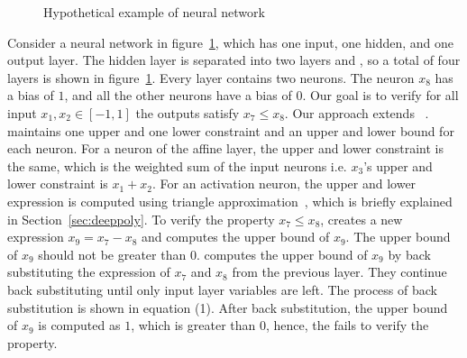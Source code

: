 \begin{figure}[t]
	\centering
	\scalebox{0.8}{}
	\caption{Hypothetical example of neural network}
	\label{fig:motivating}
\end{figure}
Consider a neural network in figure~\ref{fig:motivating},  which has one input, one hidden, and one output layer. The hidden layer is separated into two layers 
\affine{} and \relu{}, so a total of four layers is shown in figure~\ref{fig:motivating}. 
Every layer contains two neurons. The neuron $x_8$ has a bias of $1$, and all the other neurons have a bias of $0$. 
Our goal is to verify for all input $x_1,x_2 \in [-1,1]$ the outputs satisfy $x_7 \leq x_8$. 
Our approach extends \deeppoly{}~\cite{singh2019abstract}.
\deeppoly{} maintains one upper and
one lower constraint and an upper and lower bound for each neuron.
For a neuron of the affine layer, the upper and lower constraint is 
the same, which is the weighted sum of the input neurons i.e. $x_3$'s upper and lower constraint is $x_1+x_2$.
For an activation neuron, the upper and lower expression is computed using triangle approximation~\cite{singh2019abstract}, 
which is briefly explained in Section~\ref{sec:deeppoly}. To verify the property $x_7 \leq x_8$, \deeppoly{} creates a 
new expression $x_9 = x_7 - x_8$ and computes the upper bound of $x_9$. The upper bound of $x_9$ should not be greater
than $0$. \deeppoly{} computes the upper bound of $x_9$ by back substituting the expression of $x_7$ and $x_8$ 
from the previous layer.
They continue back substituting until only input layer variables are left.
The process of back substitution is shown in equation (1). %
After back substitution, the upper bound of $x_9$ is
computed as $1$, which is greater than $0$, 
hence, the \deeppoly{} fails to verify the property.

